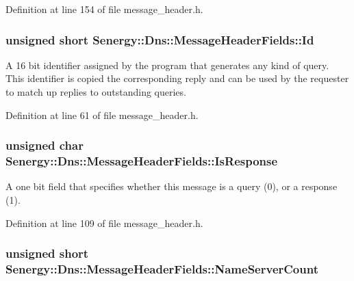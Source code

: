 Definition at line 154 of file message\-\_\-header.\-h.

\hypertarget{struct_senergy_1_1_dns_1_1_message_header_fields_ab423a1e91fecd6ad2ec36a4bdafd5c2b}{
\subsubsection[{Id}]{\setlength{\rightskip}{0pt plus 5cm}unsigned short Senergy\-::\-Dns\-::\-Message\-Header\-Fields\-::\-Id}}\label{struct_senergy_1_1_dns_1_1_message_header_fields_ab423a1e91fecd6ad2ec36a4bdafd5c2b}


A 16 bit identifier assigned by the program that generates any kind of query. This identifier is copied the corresponding reply and can be used by the requester to match up replies to outstanding queries. 



Definition at line 61 of file message\-\_\-header.\-h.

\hypertarget{struct_senergy_1_1_dns_1_1_message_header_fields_a0d0ac4fa85684c3d66a84e3392f3ef99}{
\subsubsection[{Is\-Response}]{\setlength{\rightskip}{0pt plus 5cm}unsigned char Senergy\-::\-Dns\-::\-Message\-Header\-Fields\-::\-Is\-Response}}\label{struct_senergy_1_1_dns_1_1_message_header_fields_a0d0ac4fa85684c3d66a84e3392f3ef99}


A one bit field that specifies whether this message is a query (0), or a response (1). 



Definition at line 109 of file message\-\_\-header.\-h.

\hypertarget{struct_senergy_1_1_dns_1_1_message_header_fields_a963b92841b3f7fc5fc9268c963d32d8d}{
\subsubsection[{Name\-Server\-Count}]{\setlength{\rightskip}{0pt plus 5cm}unsigned short Senergy\-::\-Dns\-::\-Message\-Header\-Fields\-::\-Name\-Server\-Count}}\label{struct_senergy_1_1_dns_1_1_message_header_fields_a963b92841b3f7fc5fc9268c963d32d8d}


